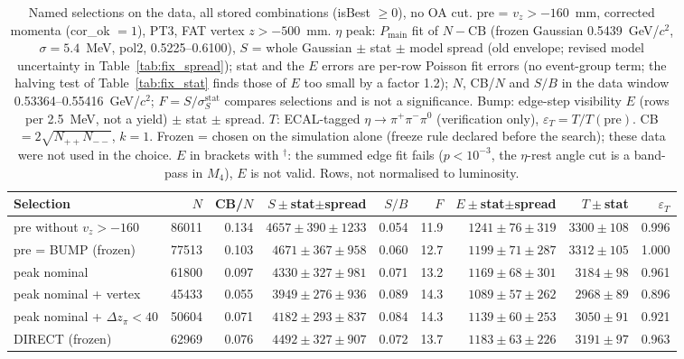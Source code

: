 \begin{table}[H]
\centering\footnotesize
\setlength{\tabcolsep}{3pt}
\caption{Named selections on the data, all stored combinations (isBest $\geq 0$), no OA cut. pre = $v_z>-160$~mm, corrected momenta (cor\_ok $=1$), PT3, FAT vertex $z>-500$~mm. $\eta$ peak: $P_\mathrm{main}$ fit of $N-\mathrm{CB}$ (frozen Gaussian 0.5439~GeV/$c^2$, $\sigma=5.4$~MeV, pol2, 0.5225--0.6100), $S$ = whole Gaussian $\pm$ stat $\pm$ model spread (old envelope; revised model uncertainty in Table~\ref{tab:fix_spread}); stat and the $E$ errors are per-row Poisson fit errors (no event-group term; the halving test of Table~\ref{tab:fix_stat} finds those of $E$ too small by a factor 1.2); $N$, CB/$N$ and $S/B$ in the data window 0.53364--0.55416~GeV/$c^2$; $F=S/\sigma_S^\mathrm{stat}$ compares selections and is not a significance. Bump: edge-step visibility $E$ (rows per 2.5~MeV, not a yield) $\pm$ stat $\pm$ spread. $T$: ECAL-tagged $\eta\to\pi^+\pi^-\pi^0$ (verification only), $\varepsilon_T=T/T(\mathrm{pre})$. CB $=2\sqrt{N_{++}N_{--}}$, $k=1$. Frozen = chosen on the simulation alone (freeze rule declared before the search); these data were not used in the choice. $E$ in brackets with $^\dagger$: the summed edge fit fails ($p<10^{-3}$, the $\eta$-rest angle cut is a band-pass in $M_4$), $E$ is not valid. Rows, not normalised to luminosity.}
\label{tab:opt_named}
\begin{tabular}{lrrrrrrrr}
\toprule
Selection & $N$ & CB/$N$ & $S\pm$stat$\pm$spread & $S/B$ & $F$ & $E\pm$stat$\pm$spread & $T\pm$stat & $\varepsilon_T$ \\
\midrule
pre without $v_z>-160$ & 86011 & 0.134 & $4657\pm390\pm1233$ & 0.054 & 11.9 & $1241\pm76\pm319$ & $3300\pm108$ & 0.996 \\
\midrule
pre = BUMP (frozen) & 77513 & 0.103 & $4671\pm367\pm958$ & 0.060 & 12.7 & $1199\pm71\pm287$ & $3312\pm105$ & 1.000 \\
peak nominal & 61800 & 0.097 & $4330\pm327\pm981$ & 0.071 & 13.2 & $1169\pm68\pm301$ & $3184\pm98$ & 0.961 \\
peak nominal + vertex & 45433 & 0.055 & $3949\pm276\pm936$ & 0.089 & 14.3 & $1089\pm57\pm262$ & $2968\pm89$ & 0.896 \\
peak nominal + $\Delta z_\pi<40$ & 50604 & 0.071 & $4182\pm293\pm837$ & 0.084 & 14.3 & $1139\pm60\pm253$ & $3050\pm91$ & 0.921 \\
DIRECT (frozen) & 62969 & 0.076 & $4492\pm327\pm907$ & 0.072 & 13.7 & $1183\pm63\pm226$ & $3191\pm97$ & 0.963 \\

\end{tabular}
\end{table}
